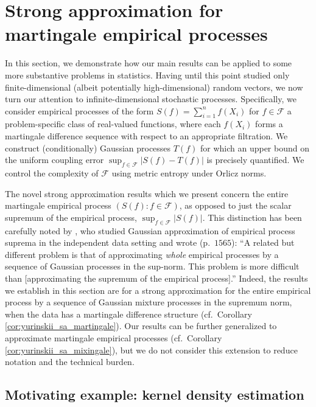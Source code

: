 \documentclass[11pt,lof]{puthesis}
\newcommand{\cF}{\ensuremath{\mathcal{F}}}
\theoremstyle{break}
\theoremstyle{proof}
\begin{document}
\section{Strong approximation for martingale empirical processes}%
\label{sec:yurinskii_emp_proc}

In this section, we demonstrate how our main results can be applied to some more
substantive problems in statistics. Having until this point studied only
finite-dimensional (albeit potentially high-dimensional) random vectors, we now
turn our attention to infinite-dimensional stochastic processes. Specifically,
we consider empirical processes of the form
$S(f) = \sum_{i=1}^{n} f(X_i)$ for $f \in \cF$
a problem-specific class of real-valued
functions, where each $f(X_i)$ forms a martingale difference sequence with
respect to an appropriate filtration. We construct (conditionally) Gaussian
processes $T(f)$ for which an upper bound on the uniform coupling error
$\sup_{f \in \cF} |S(f) - T(f)|$ is precisely quantified. We control the
complexity of $\cF$ using metric entropy under Orlicz norms.

The novel strong approximation results which we present concern the entire
martingale empirical process $(S(f):f \in \cF)$, as opposed to just the scalar
supremum of the empirical process, $\sup_{f \in \cF} |S(f)|$. This distinction
has been carefully noted by \citet{chernozhukov2014gaussian}, who studied
Gaussian approximation of empirical process suprema in the independent data
setting and wrote (p.\ $1565$): ``A related but different problem is that of
approximating \textit{whole} empirical processes by a sequence of Gaussian
processes in the sup-norm. This problem is more difficult than
[approximating the supremum of the empirical process].''
Indeed, the results we establish in
this section are for a strong approximation for the entire empirical process by
a sequence of Gaussian mixture processes in the supremum norm, when the data
has a martingale difference structure
(cf.\ Corollary \ref{cor:yurinskii_sa_martingale}).
Our results can be further generalized to approximate martingale
empirical processes (cf.\ Corollary \ref{cor:yurinskii_sa_mixingale}), but we
do not
consider this extension to reduce notation and the technical burden.

\subsection{Motivating example: kernel density estimation}
\label{sec:yurinskii_kde}
\end{document}
